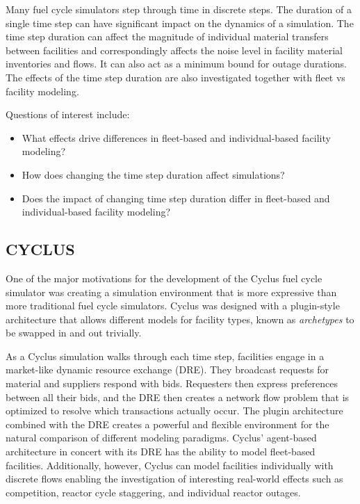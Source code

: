 \documentclass{style}
\begin{document}
Many fuel cycle simulators step through time in discrete steps.  The duration
of a single time step can have significant impact on the dynamics of a
simulation.  The time step duration can affect the magnitude of individual
material transfers between facilities and correspondingly affects the noise
level in facility material inventories and flows.  It can also act as a
minimum bound for outage durations. The effects of the time step duration are
also investigated together with fleet vs facility modeling.

Questions of interest include:

\begin{itemize}

    \item What effects drive differences in fleet-based and individual-based
        facility modeling?

    \item How does changing the time step duration affect simulations?

    \item Does the impact of changing time step duration differ in fleet-based
        and individual-based facility modeling?

\end{itemize}

\subsection{CYCLUS}

One of the major motivations for the development of the Cyclus fuel cycle
simulator \cite{cyclus_2015} was creating a simulation environment that is
more expressive than more traditional fuel cycle simulators.  Cyclus was
designed with a plugin-style architecture that allows different models for
facility types, known as \emph{archetypes} to be swapped in and out trivially.

As a Cyclus simulation walks through each time step, facilities engage in a
market-like dynamic resource exchange (DRE).  They broadcast requests for
material and suppliers respond with bids. Requesters then express preferences
between all their bids, and the DRE then creates a network flow problem that
is optimized to resolve which transactions actually occur.  The plugin
architecture combined with the DRE creates a powerful and flexible environment
for the natural comparison of different modeling paradigms.  Cyclus'
agent-based architecture in concert with its DRE has the ability to model
fleet-based facilities.  Additionally, however, Cyclus can model facilities
individually with discrete flows enabling the investigation of interesting
real-world effects such as competition, reactor cycle staggering, and
individual reactor outages. 
\end{document}
